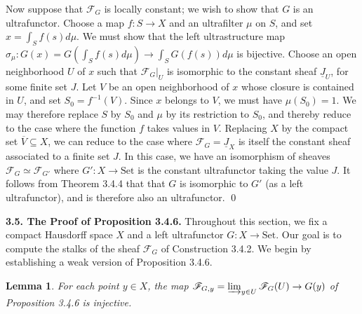 \documentclass[11pt]{article}
\theoremstyle{plain}
\newtheorem{lemma}{Lemma}
\theoremstyle{definition}
\begin{document}
Now suppose that $\mathscr{F}_G$ is locally constant; we wish to show that $G$ is an ultrafunctor. Choose a map $f : S \to X$ and an ultrafilter $\mu$ on $S$, and set $x = \int_S f(s)d\mu$. We must show that the left ultrastructure map $\sigma_\mu : G(x) = G(\int_S f(s)d\mu) \to \int_S G(f(s))d\mu$ is bijective. Choose an open neighborhood $U$ of $x$ such that $\mathscr{F}_G|_U$ is isomorphic to the constant sheaf $\underline{J}_U$, for some finite set $J$. Let $V$ be an open neighborhood of $x$ whose closure is contained in $U$, and set $S_0 = f^{-1}(V)$. Since $x$ belongs to $V$, we must have $\mu(S_0) = 1$. We may therefore replace $S$ by $S_0$ and $\mu$ by its restriction to $S_0$, and thereby reduce to the case where the function $f$ takes values in $V$. Replacing $X$ by the compact set $\overline{V} \subseteq X$, we can reduce to the case where $\mathscr{F}_G = \underline{J}_X$ is itself the constant sheaf associated to a finite set $J$. In this case, we have an isomorphism of sheaves $\mathscr{F}_G \simeq \mathscr{F}_{G'}$ where $G' : X \to \mathrm{Set}$ is the constant ultrafunctor taking the value $J$. It follows from Theorem 3.4.4 that that $G$ is isomorphic to $G'$ (as a left ultrafunctor), and is therefore also an ultrafunctor. \qed

\smallskip

\noindent\textbf{3.5. The Proof of Proposition 3.4.6.} Throughout this section, we fix a compact Hausdorff space $X$ and a left ultrafunctor $G : X \to \mathrm{Set}$. Our goal is to compute the stalks of the sheaf $\mathscr{F}_G$ of Construction 3.4.2. We begin by establishing a weak version of Proposition 3.4.6.

\renewcommand{\thelemma}{3.5.1}
\begin{lemma}
For each point $y \in X$, the map $\mathscr{F}_{G,y} = \varinjlim_{y \in U} \mathscr{F}_G(U) \to G(y)$ of Proposition 3.4.6 is injective.
\end{lemma}
\end{document}
